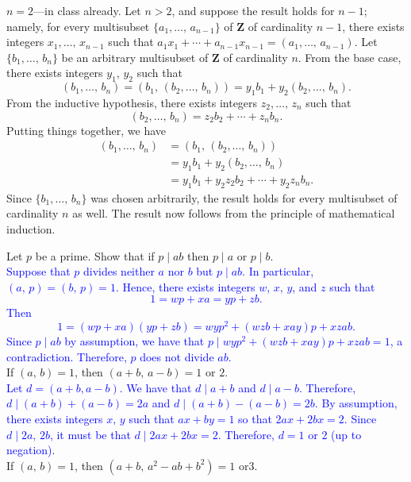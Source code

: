 \documentclass[a4paper,11pt]{article}
\theoremstyle{mythm}
\theoremstyle{mydef}
\newcommand{\blue}[1]{\textcolor{blue}{#1}}
\newcommand{\Z}{\mathbf{Z}}
\begin{document}
{\begin{enumerate}[(a)]
$n=2$---in class already. Let $n>2$, and suppose the result holds for $n-1$;
namely, for every multisubset $\{a_1,\dots,\,a_{n-1}\}$ of $\Z$ of cardinality
$n-1$, there exists integers $x_1,\dots,\,x_{n-1}$ such that
$a_1x_1+\cdots+a_{n-1}x_{n-1}=(a_1,\dots,\,a_{n-1})$. Let $\{b_1,\dots,\,b_n\}$
be an arbitrary multisubset of $\Z$ of cardinality $n$. From the base case,
there exists integers $y_1,\,y_2$ such that
\[
  (b_1,\dots,\,b_n) = (b_1,\,(b_2,\dots,\,b_n)) = y_1b_1 + y_2(b_2,\dots,\,b_n).
\]
From the inductive hypothesis, there exists integers $z_2,\dots,\,z_n$ such that
\[
  (b_2,\dots,\,b_n) = z_2b_2+\cdots+z_nb_n.
\]
Putting things together, we have
\begin{align*}
  (b_1,\dots,\,b_n) &= (b_1,\,(b_2,\dots,\,b_n)) \\
                    &= y_1b_1+y_2(b_2,\dots,\,b_n) \\
                    &= y_1b_1+y_2z_2b_2+\cdots+y_2z_nb_n.
\end{align*}
Since $\{b_1,\dots,\,b_n\}$ was chosen arbitrarily, the result holds for every
multisubset of cardinality $n$ as well. The result now follows from the
principle of mathematical induction.
\end{enumerate}}

 Let $p$ be a prime. Show that if $p \mid ab$ then $p
\mid a$ or $p \mid b$. \\

\blue{Suppose that $p$ divides neither $a$ nor $b$ but $p \mid ab$. In
particular, $(a,\,p)=(b,\,p)=1$. Hence, there exists integers $w$, $x$, $y$, and
$z$ such that
  \[
    1 = wp+xa = yp+zb.
  \]
  Then
  \[
    1=(wp+xa)(yp+zb) = wyp^2+(wzb+xay)p+xzab.
  \]
  Since $p \mid ab$ by assumption, we have that $p \mid
  wyp^2+(wzb+xay)p+xzab=1$, a contradiction. Therefore, $p$ does not divide
  $ab$.} \\

 If $(a,\,b)=1$, then $(a+b,\,a-b)=1\text{ or }2$. \\

\blue{Let $d=(a+b,a-b)$. We have that $d \mid a+b$ and $d \mid a-b$. Therefore,
  $d \mid (a+b)+(a-b)=2a$ and $d \mid (a+b)-(a-b)=2b$. By assumption, there
  exists integers $x,\,y$ such that $ax+by=1$ so that $2ax+2bx=2$. Since $d \mid
  2a,\,2b$, it must be that $d \mid 2ax+2bx=2$. Therefore, $d=1\text{ or }2$ (up
  to negation).} \\

 If $(a,\,b)=1$, then $(a+b,\,a^2-ab+b^2)=1\text{ or
}3$. \\
\end{document}
